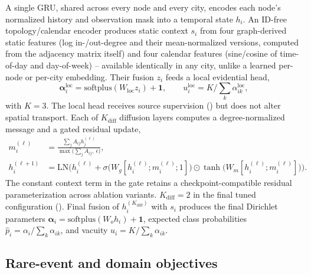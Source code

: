 A single GRU, shared across every node and every city, encodes each node's normalized history and
observation mask into a temporal state $h_i$. An ID-free topology/calendar encoder produces static
context $s_i$ from four graph-derived static features (log in-/out-degree and their mean-normalized
versions, computed from the adjacency matrix itself) and four calendar features (sine/cosine of
time-of-day and day-of-week) -- available identically in any city, unlike a learned per-node or
per-city embedding. Their fusion $z_i$ feeds a local evidential head,
\begin{equation}
  \boldsymbol\alpha_i^{\mathrm{loc}} = \mathrm{softplus}(W_{\mathrm{loc}} z_i) + \mathbf{1}, \qquad
  u_i^{\mathrm{loc}} = K \big/ \textstyle\sum_k \alpha_{ik}^{\mathrm{loc}},
  \label{eq:local-evidential}
\end{equation}
with $K=3$. The local head receives source supervision () but does not
alter spatial transport. Each of $K_{\mathrm{diff}}$ diffusion layers computes a degree-normalized
message and a gated residual update,
\begin{align}
  m_i^{(\ell)} &= \frac{\sum_j A_{ij} h_j^{(\ell)}}{\max\!\big(\sum_j A_{ij},\ \epsilon\big)},
  \label{eq:diffusion-message} \\
  h_i^{(\ell+1)} &= \mathrm{LN}\Big(h_i^{(\ell)} + \sigma\big(W_g[h_i^{(\ell)}; m_i^{(\ell)}; 1]\big)
  \odot \tanh\big(W_m[h_i^{(\ell)}; m_i^{(\ell)}]\big)\Big).
  \label{eq:diffusion-update}
\end{align}
The constant context term in the gate retains a checkpoint-compatible residual parameterization
across ablation variants. $K_{\mathrm{diff}}=2$ in the final tuned configuration
(). Final fusion of $h_i^{(K_{\mathrm{diff}})}$ with $s_i$ produces the
final Dirichlet parameters $\boldsymbol\alpha_i=\mathrm{softplus}(W_o h_i)+\mathbf{1}$, expected
class probabilities $\hat p_i = \alpha_i/\sum_k \alpha_{ik}$, and vacuity $u_i=K/\sum_k\alpha_{ik}$.

\subsection{Rare-event and domain objectives}
\label{sec:method-loss}


